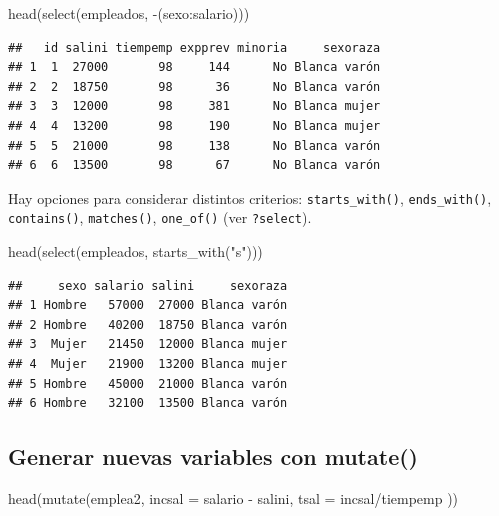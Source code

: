 \documentclass[
]{book}
\newenvironment{Shaded}{\begin{snugshade}}{\end{snugshade}}
\newcommand{\AttributeTok}[1]{\textcolor[rgb]{0.77,0.63,0.00}{#1}}
\newcommand{\FunctionTok}[1]{\textcolor[rgb]{0.00,0.00,0.00}{#1}}
\newcommand{\NormalTok}[1]{#1}
\newcommand{\SpecialCharTok}[1]{\textcolor[rgb]{0.00,0.00,0.00}{#1}}
\newcommand{\StringTok}[1]{\textcolor[rgb]{0.31,0.60,0.02}{#1}}
\theoremstyle{break}
\theoremstyle{nonumberplain}
\begin{document}
\begin{Shaded}
\begin{Highlighting}[]
\FunctionTok{head}\NormalTok{(}\FunctionTok{select}\NormalTok{(empleados, }\SpecialCharTok{{-}}\NormalTok{(sexo}\SpecialCharTok{:}\NormalTok{salario)))}
\end{Highlighting}
\end{Shaded}

\begin{verbatim}
##   id salini tiempemp expprev minoria     sexoraza
## 1  1  27000       98     144      No Blanca varón
## 2  2  18750       98      36      No Blanca varón
## 3  3  12000       98     381      No Blanca mujer
## 4  4  13200       98     190      No Blanca mujer
## 5  5  21000       98     138      No Blanca varón
## 6  6  13500       98      67      No Blanca varón
\end{verbatim}

Hay opciones para considerar distintos criterios: \texttt{starts\_with()}, \texttt{ends\_with()},
\texttt{contains()}, \texttt{matches()}, \texttt{one\_of()} (ver \texttt{?select}).

\begin{Shaded}
\begin{Highlighting}[]
\FunctionTok{head}\NormalTok{(}\FunctionTok{select}\NormalTok{(empleados, }\FunctionTok{starts\_with}\NormalTok{(}\StringTok{"s"}\NormalTok{)))}
\end{Highlighting}
\end{Shaded}

\begin{verbatim}
##     sexo salario salini     sexoraza
## 1 Hombre   57000  27000 Blanca varón
## 2 Hombre   40200  18750 Blanca varón
## 3  Mujer   21450  12000 Blanca mujer
## 4  Mujer   21900  13200 Blanca mujer
## 5 Hombre   45000  21000 Blanca varón
## 6 Hombre   32100  13500 Blanca varón
\end{verbatim}

\hypertarget{generar-nuevas-variables-con-mutate}{%
\subsection{\texorpdfstring{Generar nuevas variables con \textbf{mutate()}}{Generar nuevas variables con mutate()}}\label{generar-nuevas-variables-con-mutate}}

\begin{Shaded}
\begin{Highlighting}[]
\FunctionTok{head}\NormalTok{(}\FunctionTok{mutate}\NormalTok{(emplea2, }\AttributeTok{incsal =}\NormalTok{ salario }\SpecialCharTok{{-}}\NormalTok{ salini, }\AttributeTok{tsal =}\NormalTok{ incsal}\SpecialCharTok{/}\NormalTok{tiempemp ))}
\end{Highlighting}
\end{Shaded}
\end{document}
